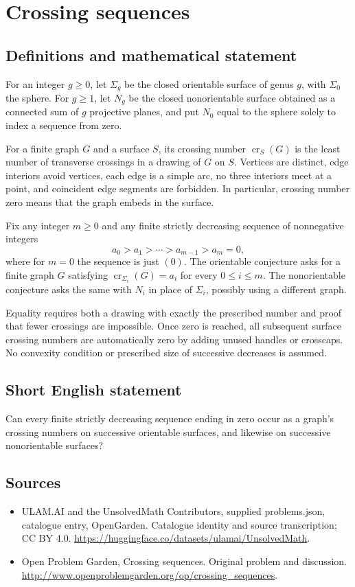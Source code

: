 \documentclass[11pt,a4paper]{article}
\begin{document}
\section*{Crossing sequences}\label{statement}

\subsection{Definitions and mathematical statement}
For an integer $g\ge0$, let $\Sigma_g$ be the closed orientable surface of genus $g$, with $\Sigma_0$ the sphere. For $g\ge1$, let $N_g$ be the closed nonorientable surface obtained as a connected sum of $g$ projective planes, and put $N_0$ equal to the sphere solely to index a sequence from zero.

For a finite graph $G$ and a surface $S$, its crossing number $\operatorname{cr}_S(G)$ is the least number of transverse crossings in a drawing of $G$ on $S$. Vertices are distinct, edge interiors avoid vertices, each edge is a simple arc, no three interiors meet at a point, and coincident edge segments are forbidden. In particular, crossing number zero means that the graph embeds in the surface.

Fix any integer $m\ge0$ and any finite strictly decreasing sequence of nonnegative integers
\[
                    a_0>a_1>\cdots>a_{m-1}>a_m=0,
\]
where for $m=0$ the sequence is just $(0)$. The orientable conjecture asks for a finite graph $G$ satisfying $\operatorname{cr}_{\Sigma_i}(G)=a_i$ for every $0\le i\le m$. The nonorientable conjecture asks the same with $N_i$ in place of $\Sigma_i$, possibly using a different graph.

Equality requires both a drawing with exactly the prescribed number and proof that fewer crossings are impossible. Once zero is reached, all subsequent surface crossing numbers are automatically zero by adding unused handles or crosscaps. No convexity condition or prescribed size of successive decreases is assumed.
\subsection{Short English statement}
Can every finite strictly decreasing sequence ending in zero occur as a graph’s crossing numbers on successive orientable surfaces, and likewise on successive nonorientable surfaces?
\subsection{Sources}
\begin{itemize}
\item[S1] ULAM.AI and the UnsolvedMath Contributors, supplied problems.json, catalogue entry, OpenGarden. Catalogue identity and source transcription; CC BY 4.0.
\url{https://huggingface.co/datasets/ulamai/UnsolvedMath}.
\item[S2] Open Problem Garden, Crossing sequences. Original problem and discussion.
\url{http://www.openproblemgarden.org/op/crossing_sequences}.
\end{itemize}
\end{document}
